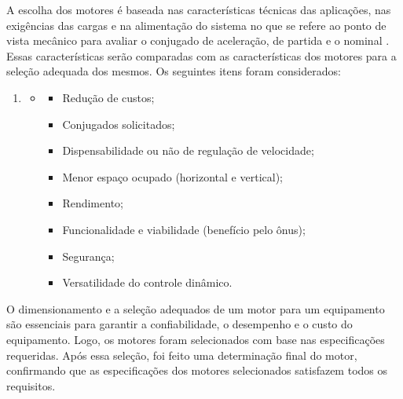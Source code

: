 A escolha dos motores é baseada nas características técnicas das aplicações, nas exigências das cargas e na alimentação do sistema no que se refere ao ponto de vista mecânico para avaliar o conjugado de aceleração, de partida e o nominal \cite{santos_2016}. Essas características serão comparadas com as características dos motores para a seleção adequada dos mesmos. Os seguintes itens foram considerados:

\begin{enumerate}
    \item[ ]
    \begin{itemize}
        \item[ ]
        \begin{itemize}
            \item Redução de custos;
            \item Conjugados solicitados;
            \item Dispensabilidade ou não de regulação de velocidade;
            \item Menor espaço ocupado (horizontal e vertical);
            \item Rendimento;
            \item Funcionalidade e viabilidade (benefício pelo ônus);
            \item Segurança;
            \item Versatilidade do controle dinâmico.
        \end{itemize}
    \end{itemize}
\end{enumerate}

O dimensionamento e a seleção adequados de um motor para um equipamento são essenciais para garantir a confiabilidade, o desempenho e o custo do equipamento. Logo, os motores foram selecionados com base nas especificações requeridas. Após essa seleção, foi feito uma determinação final do motor, confirmando que as especificações dos motores selecionados satisfazem todos os requisitos.


